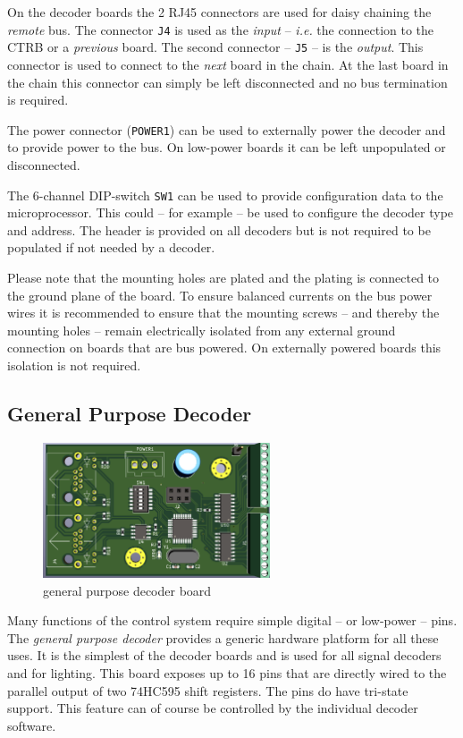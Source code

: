 \documentclass{scrreprt}
\newcommand\ie{\emph{i.e. }}
\begin{document}
On the decoder boards the 2 RJ45 connectors are used for daisy chaining the \emph{remote} bus.
The connector \texttt{J4} is used as the \emph{input} -- \ie the connection to the CTRB or a \emph{previous} board.
The second connector -- \texttt{J5} -- is the \emph{output}.
This connector is used to connect to the \emph{next} board in the chain.
At the last board in the chain this connector can simply be left disconnected and no bus termination is required.

The power connector (\texttt{POWER1}) can be used to externally power the decoder and to provide power to the bus.
On low-power boards it can be left unpopulated or disconnected.

The 6-channel DIP-switch \texttt{SW1} can be used to provide configuration data to the microprocessor.
This could -- for example -- be used to configure the decoder type and address.
The header is provided on all decoders but is not required to be populated if not needed by a decoder.

Please note that the mounting holes are plated and the plating is connected to the ground plane of the board.
To ensure balanced currents on the bus power wires it is recommended to ensure that the mounting screws -- and thereby the mounting holes -- remain electrically isolated from any external ground connection on boards that are bus powered.
On externally powered boards this isolation is not required.

\subsection{General Purpose Decoder}
\begin{figure}[h!]
    \centering
    \includegraphics[width=0.6\textwidth]{common_decoder}
    \caption{general purpose decoder board}
\end{figure}

Many functions of the control system require simple digital -- or low-power -- pins.
The \emph{general purpose decoder} provides a generic hardware platform for all these uses.
It is the simplest of the decoder boards and is used for all signal decoders and for lighting.
This board exposes up to 16 pins that are directly wired to the parallel output of two 74HC595 shift registers.
The pins do have tri-state support.
This feature can of course be controlled by the individual decoder software.
\end{document}
